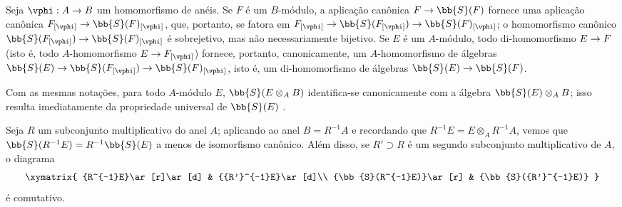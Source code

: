 \documentclass[oneside,10pt]{amsart}
\makeatletter
\newcommand{\ega@arrow}[2]{\mathchoice{#1}{#2}{#2}{#2}}
\renewcommand{\to}{\ega@arrow{\longrightarrow}{\rightarrow}}
\let\EGAOriginalLabel\label
\renewcommand{\label}[1]{\phantomsection\EGAOriginalLabel{#1}}
\makeatother
\begin{document}
\begin{env}[1.7.2]
\label{II.1.7.2}
Seja $\vphi:A\to B$ um homomorfismo de anéis.
Se $F$ é um $B$-módulo, a aplicação canônica $F\to\bb{S}(F)$ fornece uma aplicação canônica $F_{[\vphi]}\to\bb{S}(F)_{[\vphi]}$, que, portanto, se fatora em $F_{[\vphi]}\to\bb{S}(F_{[\vphi]})\to\bb{S}(F)_{[\vphi]}$; o homomorfismo canônico $\bb{S}(F_{[\vphi]})\to\bb{S}(F)_{[\vphi]}$ é sobrejetivo, mas não necessariamente bijetivo.
Se $E$ é um $A$-módulo, todo di-homomorfismo $E\to F$ (isto é, todo $A$-homomorfismo $E\to F_{[\vphi]}$) fornece, portanto, canonicamente, um $A$-homomorfismo de álgebras $\bb{S}(E)\to\bb{S}(F_{[\vphi]})\to\bb{S}(F)_{[\vphi]}$, isto é, um di-homomorfismo de álgebras $\bb{S}(E)\to\bb{S}(F)$.

Com as mesmas notações, para todo $A$-módulo $E$, $\bb{S}(E\otimes_A B)$ identifica-se canonicamente com a álgebra $\bb{S}(E)\otimes_A B$; isso resulta imediatamente da propriedade universal de $\bb{S}(E)$ .
\end{env}

\begin{env}[1.7.3]
\label{II.1.7.3}
Seja $R$ um subconjunto multiplicativo do anel $A$; aplicando  ao anel $B=R^{-1}A$ e recordando que $R^{-1}E=E\otimes_A R^{-1}A$, vemos que $\bb{S}(R^{-1}E)=R^{-1}\bb{S}(E)$ a menos de isomorfismo canônico.
Além disso, se $R'\supset R$ é um segundo subconjunto multiplicativo de $A$, o diagrama
\[
  \xymatrix{
    {R^{-1}E}\ar[r]\ar[d] & {{R'}^{-1}E}\ar[d]\\
    {\bb{S}(R^{-1}E)}\ar[r] & {\bb{S}({R'}^{-1}E)}
  }
\]
é comutativo.
\end{env}
\end{document}

